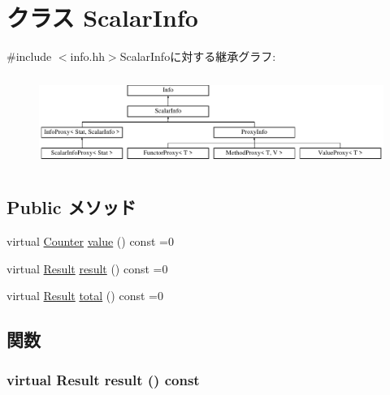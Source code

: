 \hypertarget{classStats_1_1ScalarInfo}{
\section{クラス ScalarInfo}
\label{classStats_1_1ScalarInfo}
}


{\ttfamily \#include $<$info.hh$>$}ScalarInfoに対する継承グラフ:\begin{figure}[H]
\begin{center}
\leavevmode
\includegraphics[height=3.01075cm]{classStats_1_1ScalarInfo}
\end{center}
\end{figure}
\subsection*{Public メソッド}
\begin{DoxyCompactItemize}
\item 
virtual \hyperlink{namespaceStats_ac35128c026c72bb36af9cea00774e8a6}{Counter} \hyperlink{classStats_1_1ScalarInfo_a1fb831559ad900460c4c9e4f546cd234}{value} () const =0
\item 
virtual \hyperlink{namespaceStats_ad874d2cfd4b4a29ebd480bb2e67f20ae}{Result} \hyperlink{classStats_1_1ScalarInfo_a8c2a750792392eea5225b05b9ec4bead}{result} () const =0
\item 
virtual \hyperlink{namespaceStats_ad874d2cfd4b4a29ebd480bb2e67f20ae}{Result} \hyperlink{classStats_1_1ScalarInfo_ab152b7e89b37a7db03b04d500ceb8349}{total} () const =0
\end{DoxyCompactItemize}


\subsection{関数}
\hypertarget{classStats_1_1ScalarInfo_a8c2a750792392eea5225b05b9ec4bead}{
\subsubsection[{result}]{\setlength{\rightskip}{0pt plus 5cm}virtual {\bf Result} result () const}}
\label{classStats_1_1ScalarInfo_a8c2a750792392eea5225b05b9ec4bead}


